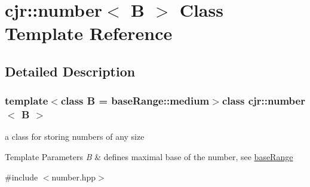 \hypertarget{classcjr_1_1number}{\section{cjr\-:\-:number$<$ B $>$ Class Template Reference}
\label{classcjr_1_1number}
}


\subsection{Detailed Description}
\subsubsection*{template$<$class B = base\-Range\-::medium$>$class cjr\-::number$<$ B $>$}

a class for storing numbers of any size 


\begin{DoxyTemplParams}{Template Parameters}
{\em B} & defines maximal base of the number, see \hyperlink{classcjr_1_1base_range}{base\-Range} \\
\hline
\end{DoxyTemplParams}


{\ttfamily \#include $<$number.\-hpp$>$}

